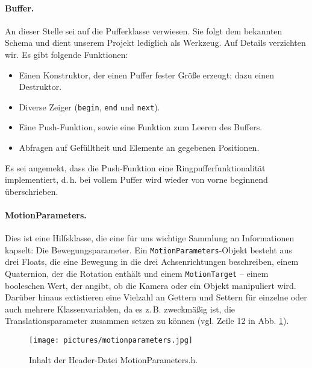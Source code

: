 	\paragraph{Buffer.} An dieser Stelle sei auf die Pufferklasse verwiesen. Sie folgt dem bekannten Schema und dient unserem Projekt lediglich als Werkzeug. Auf Details verzichten wir. Es gibt folgende Funktionen:
	\begin{itemize}
	\item Einen Konstruktor, der einen Puffer fester Größe erzeugt; dazu einen Destruktor.
	\item Diverse Zeiger (\texttt{begin}, \texttt{end} und \texttt{next}).
	\item Eine Push-Funktion, sowie eine Funktion zum Leeren des Buffers.
	\item Abfragen auf Gefülltheit und Elemente an gegebenen Positionen.
	\end{itemize}
	Es sei angemekt, dass die Push-Funktion eine Ringpufferfunktionalität implementiert, d.\,h. bei vollem Puffer wird wieder von vorne beginnend überschrieben.\par\medskip
	\paragraph{MotionParameters.} Dies ist eine Hilfsklasse, die eine für uns wichtige Sammlung an Informationen kapselt: Die Bewegungsparameter. Ein \texttt{MotionParameters}-Objekt besteht aus drei Floats, die eine Bewegung in die drei Achsenrichtungen beschreiben, einem Quaternion, der die Rotation enthält und einem \glqq \texttt{MotionTarget}\grqq{} -- einem booleschen Wert, der angibt, ob die Kamera oder ein Objekt manipuliert wird. Darüber hinaus extistieren eine Vielzahl an Gettern und Settern für einzelne oder auch mehrere Klassenvariablen, da es z.\,B.  zweckmäßig ist, die Translationsparameter zusammen setzen zu können (vgl. Zeile 12 in Abb. \ref{fig:motpar}).
	\begin{figure}[h]
	\centering
	\texttt{[image: pictures/motionparameters.jpg]}
	\caption{Inhalt der Header-Datei MotionParameters.h.}\label{fig:motpar}
	\end{figure}\par\medskip
